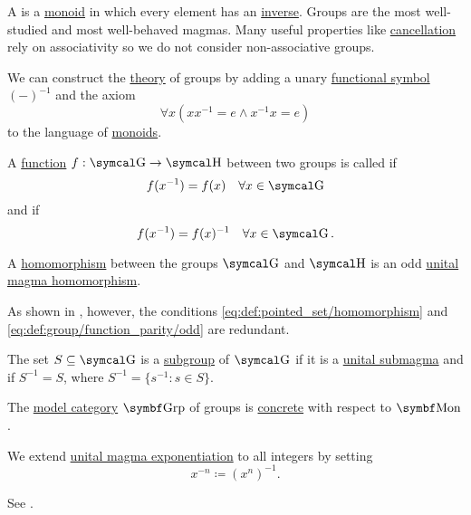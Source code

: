 \begin{definition}\label{def:group}
  A  is a \hyperref[def:unital_magma/associative]{monoid} in which every element has an \hyperref[def:unital_magma_inverse_element]{inverse}. Groups are the most well-studied and most well-behaved magmas. Many useful properties like \hyperref[thm:group_properties/cancellative]{cancellation} rely on associativity so we do not consider non-associative groups.

  \begin{DefEnum}
     We can construct the \hyperref[def:first_order_theory]{theory} of groups by adding a unary \hyperref[def:first_order_logic_alphabet/func]{functional symbol} \( (-)^{-1} \) and the axiom
    \begin{equation}\label{eq:def:group/theory/inverse_axiom}
      \forall x (xx^{-1} = e \wedge x^{-1}x = e)
    \end{equation}
    to the language of \hyperref[def:unital_magma/associative]{monoids}.

     A \hyperref[def:function/single_valued]{function} \( f: \CG \to \CH \) between two groups is called  if
    \begin{equation}\label{eq:def:group/function_parity/even}
      f(x^{-1}) = f(x) \quad\forall x \in \CG
    \end{equation}
    and  if
    \begin{equation}\label{eq:def:group/function_parity/odd}
      f(x^{-1}) = f(x)^{-1} \quad\forall x \in \CG.
    \end{equation}

     A \hyperref[def:first_order_homomorphism]{homomorphism} between the groups \( \CG \) and \( \CH \) is an odd \hyperref[def:unital_magma/homomorphism]{unital magma homomorphism}.

    As shown in , however, the conditions \eqref{eq:def:pointed_set/homomorphism} and \eqref{eq:def:group/function_parity/odd} are redundant.

     The set \( S \subseteq \CG \) is a \hyperref[def:first_order_substructure]{subgroup} of \( \CG \) if it is a \hyperref[def:unital_magma/substructure]{unital submagma} and if \( S^{-1} = S \), where \( S^{-1} = \{ s^{-1} \colon s \in S \} \).

     The \hyperref[def:first_order_model_category]{model category} \( \Cat{Grp} \) of groups is \hyperref[def:concrete_category]{concrete} with respect to \hyperref[def:unital_magma/associative]{\( \Cat{Mon} \)}.

     We extend \hyperref[def:unital_magma/exponentiation]{unital magma exponentiation} to all integers by setting
    \begin{equation*}
      x^{-n} \coloneqq (x^n)^{-1}.
    \end{equation*}

    See .
  \end{DefEnum}
\end{definition}

